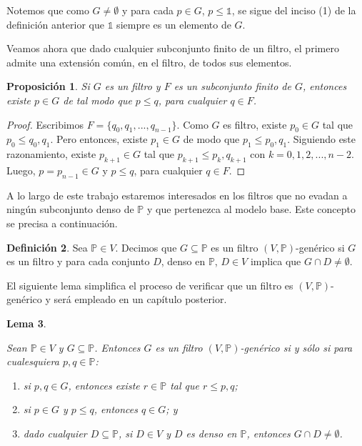 \documentclass[11pt]{unam_tesis1}
\theoremstyle{MyThmStyle}
\theoremstyle{definition}
\newtheorem{definition}{Definici\'on}[chapter]
\theoremstyle{plain}
\newtheorem{lemma}[definition]{Lema}
\newtheorem{proposition}[definition]{Proposici\'on}
\theoremstyle{remark}
\let\leq\leqslant
\begin{document}
Notemos que como $G\neq \emptyset$ y para cada $p\in G$, $p\leq \mathds 1$, se sigue del inciso (1) de la definici\'on anterior que $\mathds 1$ siempre es un elemento de $G$.

Veamos ahora que dado cualquier subconjunto finito de un filtro, el primero admite una extensi\'on com\'un, en el filtro, de todos sus elementos.

\begin{proposition}\label{extensionparamuchos}
Si $G$ es un filtro y $F$ es un subconjunto finito de $G$, entonces existe $p\in G$ de tal modo que $p\leq q$, para cualquier $q\in F$.
\end{proposition}

\begin{proof}
Escribimos $F=\{q_0,q_1,...,q_{n-1}\}$. Como $G$ es filtro, existe $p_0\in G$ tal que $p_0\leq q_0,q_1$. Pero entonces, existe $p_1\in G$ de modo que $p_1\leq p_0,q_1$. Siguiendo este razonamiento, existe $p_{k+1}\in G$ tal que $p_{k+1}\leq p_k,q_{k+1}$ con $k=0,1,2,...,n-2$. Luego, $p=p_{n-1}\in G$ y $p\leq q$, para cualquier $q\in F$.
\end{proof}

A lo largo de este trabajo estaremos interesados en los filtros que no evadan a ning\'un subconjunto denso de $\mathbb P$ y que pertenezca al modelo base. Este concepto se precisa a continuaci\'on.

\begin{definition}\label{filtrogenerico}
Sea $\mathbb P \in V$. Decimos que $G\subseteq \mathbb P$ es un filtro $(V,\mathbb P)$-gen\'erico si $G$ es un filtro y para cada conjunto $D$, denso en $\mathbb P$, $D\in V$ implica que $G\cap D\neq \emptyset$.
\end{definition}

El siguiente lema simplifica el proceso de verificar que un filtro es $(V,\mathbb P)$-gen\'erico y ser\'a empleado en un cap\'itulo posterior.

\begin{lemma}\label{filtroequivalencia}

Sean $\mathbb P\in V$ y $G\subseteq \mathbb P$. Entonces $G$ es un filtro $(V,\mathbb P)$-gen\'erico si y s\'olo si para cualesquiera $p,q\in \mathbb P$:

\begin{enumerate}

\item si $p,q\in G$, entonces existe $r\in \mathbb P$ tal que $r\leq p,q$;
\item si $p\in G$ y $p\leq q$, entonces $q\in G$; y
\item dado cualquier $D\subseteq \mathbb P$, si $D\in V$ y $D$ es denso en $\mathbb P$, entonces $G\cap D\neq \emptyset$.
\end{enumerate}

\end{lemma}
\end{document}
